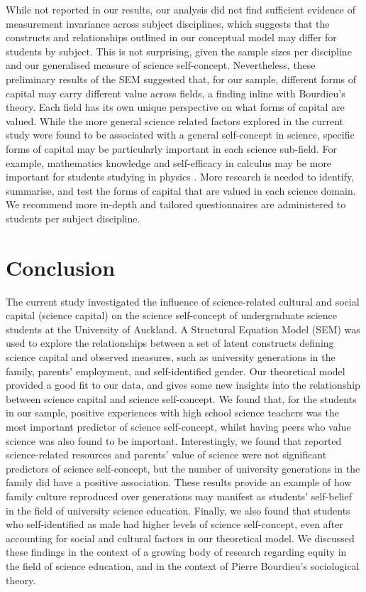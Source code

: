 While not reported in our results, our analysis did not find sufficient evidence of measurement invariance across subject disciplines, which suggests that the constructs and relationships outlined in our conceptual model may differ for students by subject. This is not surprising, given the sample sizes per discipline and our generalised measure of science self-concept. Nevertheless, these preliminary results of the SEM suggested that, for our sample, different forms of capital may carry different value across fields, a finding inline with Bourdieu's theory. Each field has its own unique perspective on what forms of capital are valued. While the more general science related factors explored in the current study were found to be associated with a general self-concept in science, specific forms of capital may be particularly important in each science sub-field. For example, mathematics knowledge and self-efficacy in calculus may be more important for students studying in physics \citep{Black2016,Ellis_2016}. More research is needed to identify, summarise, and test the forms of capital that are valued in each science domain. We recommend more in-depth and tailored questionnaires are administered to students per subject discipline.  

\section*{Conclusion}
The current study investigated the influence of science-related cultural and social capital (science capital) on the science self-concept of undergraduate science students at the University of Auckland. A Structural Equation Model (SEM) was used to explore the relationships between a set of latent constructs defining science capital and observed measures, such as university generations in the family, parents' employment, and self-identified gender. Our theoretical model provided a good fit to our data, and gives some new insights into the relationship between science capital and science self-concept. We found that, for the students in our sample, positive experiences with high school science teachers was the most important predictor of science self-concept, whilst having peers who value science was also found to be important. Interestingly, we found that reported science-related resources and parents' value of science were not significant predictors of science self-concept, but the number of university generations in the family did have a positive association. These results provide an example of how family culture reproduced over generations may manifest as students' self-belief in the field of university science education. Finally, we also found that students who self-identified as male had higher levels of science self-concept, even after accounting for social and cultural factors in our theoretical model. We discussed these findings in the context of a growing body of research regarding equity in the field of science education, and in the context of Pierre Bourdieu's sociological theory.  

